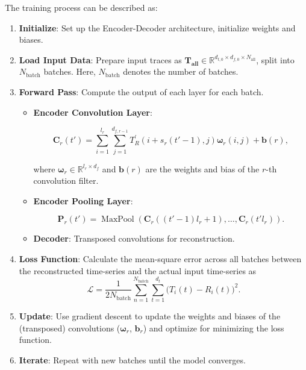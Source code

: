 The training process can be described as:
\begin{enumerate}
    \item \textbf{Initialize}: Set up the Encoder-Decoder architecture, initialize weights and biases.
    \item \textbf{Load Input Data}: Prepare input traces as $\mathbf{T_{\text{all}}} \in \mathbb{R}^{ d_{t,0} \times d_{f,0} \times N_{\text{all}}}$, split into $N_{\text{batch}}$ batches. Here, $N_{\text{batch}}$ denotes the number of batches.
    \item \textbf{Forward Pass}: Compute the output of each layer for each batch.
    
    \begin{itemize}
        \item \textbf{Encoder Convolution Layer}:
        \begin{footnotesize}
        \begin{equation}
        \boldsymbol{C}_r(t') = \sum_{i=1}^{l_r} \sum_{j=1}^{d_{f, r-1}} T^{'}_R(i+s_r(t'-1), j) \boldsymbol{\omega}_r(i, j) + \boldsymbol{b}(r),
        \end{equation}
        \end{footnotesize}
        where $\boldsymbol{\omega}_r \in \mathbb{R}^{l_r \times d_f}$ and $\boldsymbol{b}(r)$ are the weights and bias of the $r$-th convolution filter.
        
        \item \textbf{Encoder Pooling Layer}:
        \begin{footnotesize}
        \begin{equation}
        \boldsymbol{P}_r(t') = \operatorname{MaxPool}\left(\boldsymbol{C}_r((t'-1)l_r+1), \ldots, \boldsymbol{C}_r(t' l_r)\right).
        \end{equation}
        \end{footnotesize}
        \item \textbf{Decoder}: Transposed convolutions for reconstruction.
    \end{itemize}
    \item \textbf{Loss Function}: Calculate the mean-square error across all batches between the reconstructed time-series and the actual input time-series as
    \begin{equation}
    \mathcal{L} = \frac{1}{2N_{\text{batch}}} \sum_{n=1}^{N_{\text{batch}}} \sum_{t=1}^{d_t} \Big(T_i(t) - R_i(t) \Big)^2.
    \end{equation}
    \item \textbf{Update}: Use gradient descent to update the weights and biases of the (transposed) convolutions ($\boldsymbol{\omega}_r$, $\boldsymbol{b}_r$) and optimize for minimizing the loss function.
    \item \textbf{Iterate}: Repeat with new batches until the model converges.
\end{enumerate}

